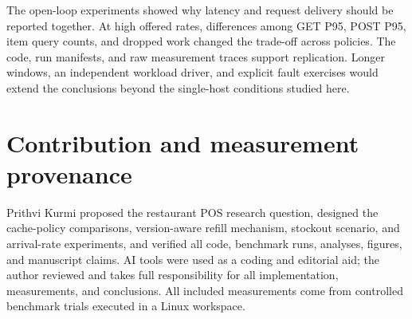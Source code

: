 \documentclass[conference]{IEEEtran}
\begin{document}
The open-loop experiments showed why latency and request delivery should be reported together. At high offered rates, differences among GET P95, POST P95, item query counts, and dropped work changed the trade-off across policies. The code, run manifests, and raw measurement traces support replication. Longer windows, an independent workload driver, and explicit fault exercises would extend the conclusions beyond the single-host conditions studied here.

\section*{Contribution and measurement provenance}

Prithvi Kurmi proposed the restaurant POS research question, designed the cache-policy comparisons, version-aware refill mechanism, stockout scenario, and arrival-rate experiments, and verified all code, benchmark runs, analyses, figures, and manuscript claims. AI tools were used as a coding and editorial aid; the author reviewed and takes full responsibility for all implementation, measurements, and conclusions. All included measurements come from controlled benchmark trials executed in a Linux workspace.
\end{document}

